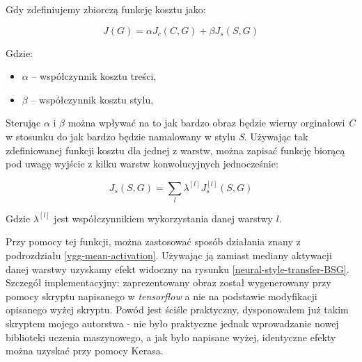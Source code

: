 Gdy zdefiniujemy zbiorczą funkcję kosztu jako:

\[J(G) = \alpha J_{c}(C,G) + \beta J_{s}(S,G)\]

Gdzie:
\begin{itemize}
\item
    \(\alpha\) -- współczynnik kosztu treści,
\item
    \(\beta\) -- współczynnik kosztu stylu,
\end{itemize}

Sterując \(\alpha\) i \(\beta\) można wpływać na to jak bardzo obraz będzie wierny orginałowi \textit{C} w stosunku do jak bardzo będzie namalowany w stylu \textit{S}. Używając tak zdefiniowanej funkcji kosztu dla jednej 
z warstw, można zapisać funkcję biorącą pod uwagę wyjście z kilku warstw konwolucyjnych jednocześnie: 

\[J_{s}(S,G) = \sum_{l} \lambda^{[l]} J^{[l]}_{s}(S,G) \]

Gdzie \(\lambda^{[l]}\) jest współczynnikiem wykorzystania danej warstwy \(l\).

Przy pomocy tej funkcji, można zastosować sposób działania znany z podrozdziału \ref{vgg-mean-activation}. Używając ją zamiast mediany aktywacji danej warstwy uzyskamy efekt widoczny na rysunku \ref{neural-style-transfer-BSG}. Szczegół implementacyjny: zaprezentowany obraz został wygenerowany przy pomocy skryptu napisanego w \textit{tensorflow} a nie na podstawie modyfikacji opisanego wyżej skryptu.
Powód jest ściśle praktyczny, dysponowałem już takim skryptem mojego autorstwa - nie było praktyczne jednak wprowadzanie nowej biblioteki uczenia maszynowego, a jak było napisane wyżej, identyczne efekty można uzyskać przy pomocy Kerasa.

